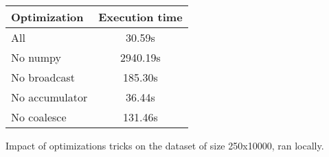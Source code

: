 \begin{tabular}{l c}
    \toprule
    \textbf{Optimization} & \textbf{Execution time} \\
    \midrule
    All            & 30.59s     \\
    No numpy       & 2940.19s   \\
    No broadcast   & 185.30s    \\ 
    No accumulator & 36.44s     \\
    No coalesce    & 131.46s    \\
    \bottomrule
\end{tabular}
\caption{Impact of optimizations tricks on the dataset of size 250x10000, ran locally.}
\label{tab:q3_local_optimisations}